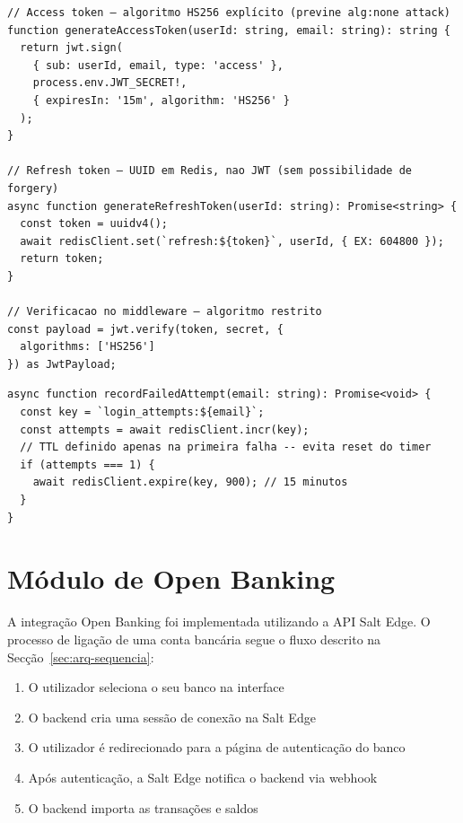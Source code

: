 \begin{lstlisting}[caption={Geração e verificação de tokens JWT com algoritmo explícito (authService.ts).},label={lst:auth}]
// Access token — algoritmo HS256 explícito (previne alg:none attack)
function generateAccessToken(userId: string, email: string): string {
  return jwt.sign(
    { sub: userId, email, type: 'access' },
    process.env.JWT_SECRET!,
    { expiresIn: '15m', algorithm: 'HS256' }
  );
}

// Refresh token — UUID em Redis, nao JWT (sem possibilidade de forgery)
async function generateRefreshToken(userId: string): Promise<string> {
  const token = uuidv4();
  await redisClient.set(`refresh:${token}`, userId, { EX: 604800 });
  return token;
}

// Verificacao no middleware — algoritmo restrito
const payload = jwt.verify(token, secret, {
  algorithms: ['HS256']
}) as JwtPayload;
\end{lstlisting}

\begin{lstlisting}[caption={Bloqueio de conta por tentativas falhadas (Redis).},label={lst:lockout}]
async function recordFailedAttempt(email: string): Promise<void> {
  const key = `login_attempts:${email}`;
  const attempts = await redisClient.incr(key);
  // TTL definido apenas na primeira falha -- evita reset do timer
  if (attempts === 1) {
    await redisClient.expire(key, 900); // 15 minutos
  }
}
\end{lstlisting}


\section{Módulo de Open Banking}
\label{sec:impl-openbanking}

A integração Open Banking foi implementada utilizando a \ac{API} Salt Edge. O processo de ligação de uma conta bancária segue o fluxo descrito na Secção~\ref{sec:arq-sequencia}:

\begin{enumerate}
    \item O utilizador seleciona o seu banco na interface
    \item O backend cria uma sessão de conexão na Salt Edge
    \item O utilizador é redirecionado para a página de autenticação do banco
    \item Após autenticação, a Salt Edge notifica o backend via webhook
    \item O backend importa as transações e saldos
\end{enumerate}

